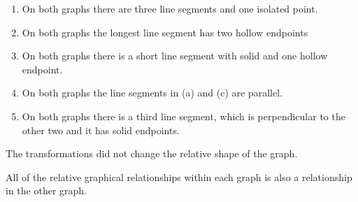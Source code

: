 \documentclass{ximera}
\begin{document}
\begin{image}
\end{image}




\begin{enumerate}
\item On both graphs there are three line segments and one isolated point.
\item On both graphs the longest line segment has two hollow endpoints
\item On both graphs there is a short line segment with solid and one hollow endpoint. 
\item On both graphs the line segments in (a) and (c) are parallel.
\item On both graphs there is a third line segment, which is perpendicular to the other two and it has solid endpoints.
\end{enumerate}




The transformations did not change the relative shape of the graph.



All of the relative graphical relationships within each graph is also a relationship in the other graph. 
\end{document}
